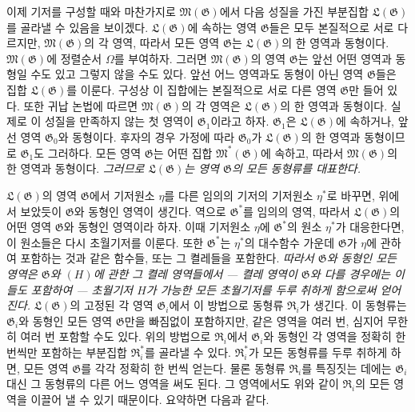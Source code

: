 이제 기저를 구성할 때와 마찬가지로 $\mathfrak M(\mathfrak G)$에서 다음 성질을 가진 부분집합 $\mathfrak L(\mathfrak G)$를 골라낼 수 있음을 보이겠다. $\mathfrak L(\mathfrak G)$에 속하는 영역 $\mathfrak G$들은 모두 본질적으로 서로 다르지만, $\mathfrak M(\mathfrak G)$의 각 영역, 따라서 모든 영역 $\mathfrak G$는 $\mathfrak L(\mathfrak G)$의 한 영역과 동형이다. $\mathfrak M(\mathfrak G)$에 정렬순서 $\Omega$를 부여하자. 그러면 $\mathfrak M(\mathfrak G)$의 영역 $\mathfrak G$는 앞선 어떤 영역과 동형일 수도 있고 그렇지 않을 수도 있다. 앞선 어느 영역과도 동형이 아닌 영역 $\mathfrak G$들은 집합 $\mathfrak L(\mathfrak G)$를 이룬다. 구성상 이 집합에는 본질적으로 서로 다른 영역 $\mathfrak G$만 들어 있다. 또한 귀납 논법에 따르면 $\mathfrak M(\mathfrak G)$의 각 영역은 $\mathfrak L(\mathfrak G)$의 한 영역과 동형이다. 실제로 이 성질을 만족하지 않는 첫 영역이 $\mathfrak G_1$이라고 하자. $\mathfrak G_1$은 $\mathfrak L(\mathfrak G)$에 속하거나, 앞선 영역 $\mathfrak G_0$와 동형이다. 후자의 경우 가정에 따라 $\mathfrak G_0$가 $\mathfrak L(\mathfrak G)$의 한 영역과 동형이므로 $\mathfrak G_1$도 그러하다. 모든 영역 $\mathfrak G$는 어떤 집합 $\mathfrak M^*(\mathfrak G)$에 속하고, 따라서 $\mathfrak M(\mathfrak G)$의 한 영역과 동형이다. \emph{그러므로 $\mathfrak L(\mathfrak G)$는 영역 $\mathfrak G$의 모든 동형류를 대표한다.}

$\mathfrak L(\mathfrak G)$의 영역 $\mathfrak G$에서 기저원소 $\eta$를 다른 임의의 기저의 기저원소 $\eta^*$로 바꾸면, 위에서 보았듯이 $\mathfrak G$와 동형인 영역이 생긴다. 역으로 $\mathfrak G^*$를 임의의 영역, 따라서 $\mathfrak L(\mathfrak G)$의 어떤 영역 $\mathfrak G$와 동형인 영역이라 하자. 이때 기저원소 $\eta$에 $\mathfrak G^*$의 원소 $\eta^*$가 대응한다면, 이 원소들은 다시 초월기저를 이룬다. 또한 $\mathfrak G^*$는 $\eta^*$의 대수함수 가운데 $\mathfrak G$가 $\eta$에 관하여 포함하는 것과 같은 함수들, 또는 그 켤레들을 포함한다. \emph{따라서 $\mathfrak G$와 동형인 모든 영역은 $\mathfrak G$와 $(H)$에 관한 그 켤레 영역들에서} \emph{--- 켤레 영역이 $\mathfrak G$와 다를 경우에는 이들도 포함하여 --- 초월기저 $H$가 가능한 모든 초월기저를 두루 취하게 함으로써 얻어진다.} $\mathfrak L(\mathfrak G)$의 고정된 각 영역 $\mathfrak G_i$에서 이 방법으로 동형류 $\mathfrak R_i$가 생긴다. 이 동형류는 $\mathfrak G_i$와 동형인 모든 영역 $\mathfrak G$만을 빠짐없이 포함하지만, 같은 영역을 여러 번, 심지어 무한히 여러 번 포함할 수도 있다. 위의 방법으로 $\mathfrak R_i$에서 $\mathfrak G_i$와 동형인 각 영역을 정확히 한 번씩만 포함하는 부분집합 $\mathfrak R_i^*$를 골라낼 수 있다. $\mathfrak R_i^*$가 모든 동형류를 두루 취하게 하면, 모든 영역 $\mathfrak G$를 각각 정확히 한 번씩 얻는다. 물론 동형류 $\mathfrak R_i$를 특징짓는 데에는 $\mathfrak G_i$ 대신 그 동형류의 다른 어느 영역을 써도 된다. 그 영역에서도 위와 같이 $\mathfrak R_i$의 모든 영역을 이끌어 낼 수 있기 때문이다. 요약하면 다음과 같다.

